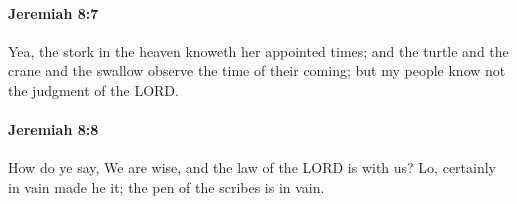 		\paragraph{Jeremiah 8:7} %
			\label{JEREMIAH-8-7}

			Yea, the stork in the heaven knoweth her appointed times; and the turtle and the crane and the swallow observe the time of their coming; but my people know not the judgment of the LORD.


		\paragraph{Jeremiah 8:8} %
			\label{JEREMIAH-8-8}

			How do ye say, We are wise, and the law of the LORD is with us? Lo, certainly in vain made he it; the pen of the scribes is in vain.


